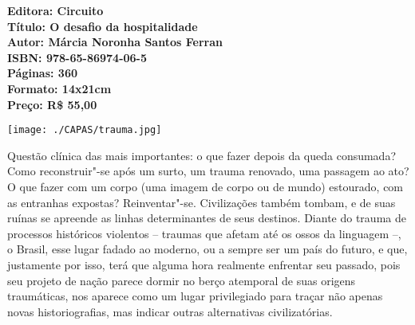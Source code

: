 
\vfill
\enlargethispage{\baselineskip}

\hspace*{-.4cm}\begin{minipage}[c]{1\linewidth}
\small\textbf{
\hspace*{-.1cm}Editora: Circuito\\
Título: O desafio da hospitalidade\\
Autor: Márcia Noronha Santos Ferran\\ 
ISBN: 978-65-86974-06-5\\
Páginas: 360\\
Formato: 14x21cm\\
Preço: R\$ 55,00\\
}
\end{minipage}



\pagebreak %


\begin{center}
\hspace*{.5cm}\texttt{[image: ./CAPAS/trauma.jpg]}
\end{center}

\hspace*{-7cm}\hrulefill\hspace*{-7cm}

\medskip

\noindent{}Questão clínica das mais importantes: o que fazer depois da queda
consumada? Como reconstruir"-se após um surto, um trauma
renovado, uma passagem ao ato? O que fazer com um corpo (uma imagem de corpo
ou de mundo) estourado, com as entranhas expostas?  Reinventar"-se.
Civilizações também tombam, e de suas ruínas se apreende
as linhas determinantes de seus destinos. Diante do trauma de
processos históricos violentos – traumas que afetam até os ossos da linguagem –, o
Brasil, esse lugar fadado ao moderno, ou a sempre ser um país do futuro, e que,
justamente por isso, terá que alguma hora realmente enfrentar seu passado, pois seu
projeto de nação parece dormir no berço atemporal de suas origens traumáticas, nos
aparece como um lugar privilegiado para traçar não apenas novas historiografias, mas
indicar outras alternativas civilizatórias.

